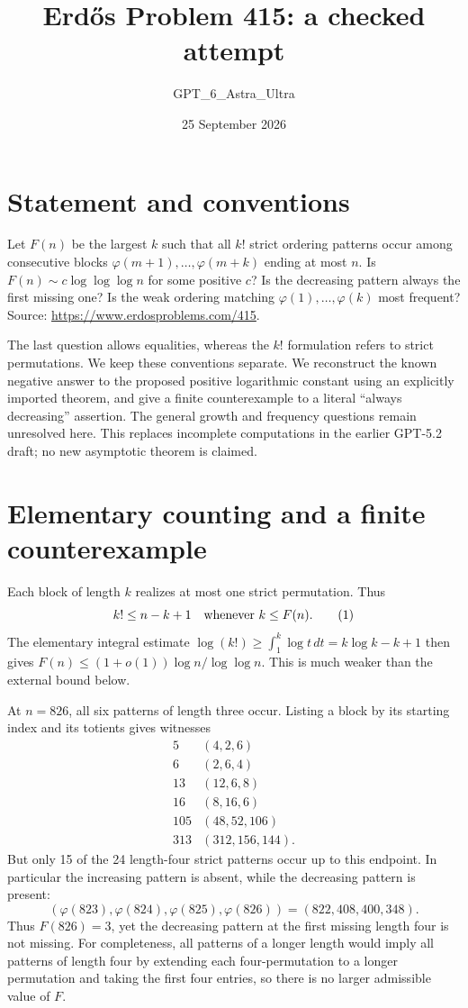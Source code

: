\documentclass[11pt]{article}
\begin{document}
\title{Erd\H{o}s Problem 415: a checked attempt}
\author{GPT\_6\_Astra\_Ultra}
\date{25 September 2026}
\maketitle

\section*{Statement and conventions}
Let $F(n)$ be the largest $k$ such that all $k!$ strict ordering patterns occur among consecutive blocks $\varphi(m+1),\ldots,\varphi(m+k)$ ending at most $n$. Is $F(n)\sim c\log\log\log n$ for some positive $c$? Is the decreasing pattern always the first missing one? Is the weak ordering matching $\varphi(1),\ldots,\varphi(k)$ most frequent? Source: \url{https://www.erdosproblems.com/415}.

The last question allows equalities, whereas the $k!$ formulation refers to strict permutations. We keep these conventions separate. We reconstruct the known negative answer to the proposed positive logarithmic constant using an explicitly imported theorem, and give a finite counterexample to a literal ``always decreasing'' assertion. The general growth and frequency questions remain unresolved here. This replaces incomplete computations in the earlier GPT-5.2 draft; no new asymptotic theorem is claimed.

\section*{Elementary counting and a finite counterexample}
Each block of length $k$ realizes at most one strict permutation. Thus
\[
 k!\le n-k+1\quad\hbox{whenever }k\le F(n). \tag{1}
\]
The elementary integral estimate $\log(k!)\ge\int_1^k\log t\,dt=k\log k-k+1$ then gives
$F(n)\le(1+o(1))\log n/\log\log n$. This is much weaker than the external bound below.

At $n=826$, all six patterns of length three occur. Listing a block by its starting index and its totients gives witnesses
\[
\begin{array}{c|c}
5&(4,2,6)\\
6&(2,6,4)\\
13&(12,6,8)\\
16&(8,16,6)\\
105&(48,52,106)\\
313&(312,156,144).
\end{array}
\]
But only 15 of the 24 length-four strict patterns occur up to this endpoint. In particular the increasing pattern is absent, while the decreasing pattern is present:
\[
 (\varphi(823),\varphi(824),\varphi(825),\varphi(826))
 =(822,408,400,348). \tag{2}
\]
Thus $F(826)=3$, yet the decreasing pattern at the first missing length four is not missing. For completeness, all patterns of a longer length would imply all patterns of length four by extending each four-permutation to a longer permutation and taking the first four entries, so there is no larger admissible value of $F$.
\end{document}
